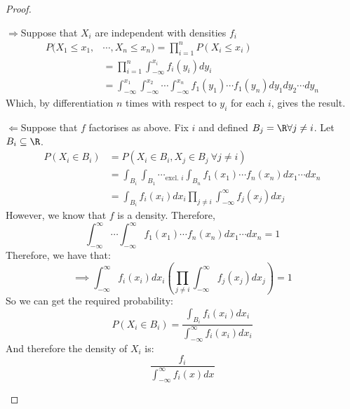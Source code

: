 \documentclass[../Main.tex]{subfiles}
\begin{document}
\begin{proof}
    \begin{proofdirection}{$\Rightarrow$}{Suppose that $X_i$ are independent with densities $f_i$}
        \begin{align*}
            P(X_1 \leq x_1, &\cdots, X_n \leq x_n) = \prod_{i = 1}^n P(X_i \leq x_i) \\
            &= \prod_{i = 1}^n \int_{-\infty}^{x_i} f_i(y_i) dy_i \\
            &= \int_{-\infty}^{x_1} \int_{-\infty}^{x_2} \cdots \int_{-\infty}^{x_n} f_1(y_1) \cdots f_1(y_n) dy_1 dy_2 \cdots dy_n
        \end{align*}
        Which, by differentiation $n$ times with respect to $y_i$ for each $i$, gives the result.
    \end{proofdirection}
    \begin{proofdirection}{$\Leftarrow$}{Suppose that $f$ factorises as above.}
        Fix $i$ and defined $B_j = \R \forall j \neq i$. Let $B_i \subseteq \R$.
        \begin{align*}
            P(X_i \in B_i) &= P(X_i \in B_i, X_j \in B_j~\forall j \neq i) \\
            &= \int_{B_i} \int_{B_1} \cdots_{\text{excl. } i} \int_{B_n} f_1(x_1) \cdots f_n(x_n) dx_1 \cdots dx_n \\
            &= \int_{B_i} f_i(x_i) dx_i \prod_{j \neq i} \int_{-\infty}^\infty f_j(x_j) dx_j
        \end{align*}
        However, we know that $f$ is a density. Therefore,
        \begin{equation*}
            \int_{-\infty}^\infty \cdots \int_{-\infty}^\infty f_1(x_1) \cdots f_n(x_n) dx_1 \cdots dx_n = 1
        \end{equation*}
        Therefore, we have that:
        \begin{equation*}
            \implies \int_{-\infty}^\infty f_i(x_i) dx_i \left(\prod_{j \neq i} \int_{-\infty}^\infty f_j(x_j) dx_j\right) = 1
        \end{equation*}
        So we can get the required probability:
        \begin{equation*}
            P(X_i \in B_i) = \frac{\int_{B_i} f_i(x_i) dx_i}{\int_{-\infty}^\infty f_i(x_i) dx_i}
        \end{equation*}
        And therefore the density of $X_i$ is:
        \begin{equation*}
            \frac{f_i}{\int_{-\infty}^\infty f_i(x) dx}
        \end{equation*}

\end{proofdirection}
\end{proof}
\end{document}
